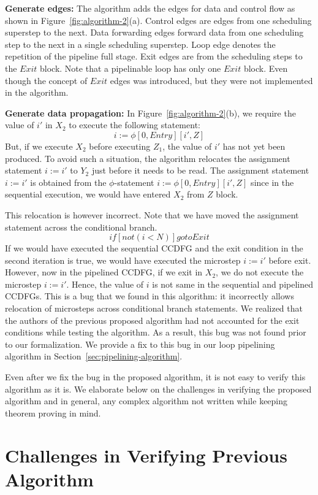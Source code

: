 {\bf Generate edges:} The algorithm adds the edges for data and control flow as shown in Figure~\ref{fig:algorithm-2}(a). Control edges are edges from one scheduling superstep to the next. Data forwarding edges forward data from one scheduling step to the next in a single scheduling superstep. Loop edge denotes the repetition of the pipeline full stage. Exit edges are from the scheduling steps to the $Exit$ block. Note that a pipelinable loop has only one $Exit$ block. Even though the concept of $Exit$ edges was introduced, but they were not implemented in the algorithm.

{\bf Generate data propagation:} In Figure~\ref{fig:algorithm-2}(b), we require the value of $i'$ in $X_2$ to execute the following statement:
$$ i := \phi [0, Entry][i', Z]$$
But, if we execute $X_2$ before executing $Z_1$, the value of $i'$ has not yet been produced. To avoid such a situation, the algorithm relocates the assignment statement $i := i'$ to $Y_2$ just before it needs to be read. The assignment statement $i := i'$ is obtained from the $\phi$-statement $i := \phi [0, Entry][i', Z]$ since in the sequential execution, we would have entered $X_2$ from $Z$ block.

This relocation is however incorrect. Note that we have moved the assignment statement across the conditional branch. $$ if [not (i<N)] goto Exit $$ If we would have executed the sequential CCDFG and the exit condition in the second iteration is true, we would have executed the microstep $i := i'$ before exit. However, now in the pipelined CCDFG, if we exit in $X_2$, we do not execute the microstep $i := i'$. Hence, the value of $i$ is not same in the sequential and pipelined CCDFGs. This is a bug that we found in this algorithm: it incorrectly allows relocation of microsteps across conditional branch statements.
We realized that the authors of the previous proposed algorithm had not accounted for the exit conditions while testing the algorithm. As a result, this bug was not found prior to our formalization. We provide a fix to this bug in our loop pipelining algorithm in Section~\ref{sec:pipelining-algorithm}.

Even after we fix the bug in the proposed algorithm, it is not easy to verify this algorithm as it is.
We elaborate below on the challenges
in verifying the proposed algorithm and in general, any complex algorithm not written while keeping theorem proving in mind.

\section{Challenges in Verifying Previous Algorithm}

